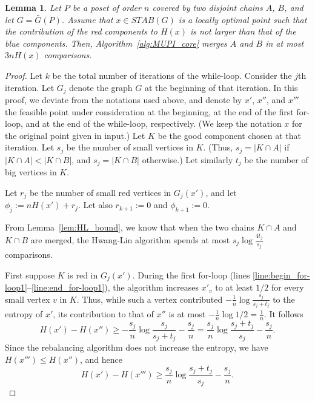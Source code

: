 \documentclass{article} \usepackage{fullpage}
\newtheorem{lemma}{Lemma}
\newcommand{\ent}{H}
\begin{document}
\begin{lemma}
\label{lem:MUPIqc}
Let $P$ be a poset of order $n$ covered by two disjoint chains $A$, $B$, and let $G = \bar{G}(P)$. Assume that $x \in STAB(G)$ is a locally optimal point such that the contribution of the red components to $\ent(x)$ is not larger than that of the blue components. Then, Algorithm~\ref{alg:MUPI_core} merges $A$ and $B$ in at most $3n\ent(x)$ comparisons.  
\end{lemma}
\begin{proof}
Let $k$ be the total number of iterations of the while-loop.
Consider the $j$th iteration. 
Let $G_{j}$ denote the graph $G$ at the beginning of that iteration.
In this proof, we deviate from the notations used above, and denote by $x'$, $x''$, and $x'''$ 
the feasible point under consideration at the beginning,
at the end of the first for-loop, and at the end of the while-loop, respectively. 
(We keep the notation $x$ for the original point given in input.)
Let $K$ be the good component chosen at that iteration.
Let $s_{j}$ be the number of small vertices in $K$. (Thus, $s_{j}= |K\cap A|$
if $|K\cap A| < |K\cap B|$, and $s_{j}= |K\cap B|$ otherwise.)
Let similarly $t_{j}$ be the number of big vertices in $K$.

Let $r_{j}$ be the number of small red vertices in $G_{j}(x')$,
and let $\phi_{j}:= n\ent(x') + r_{j}$. Let also $r_{k+1} := 0$ and $\phi_{k+1} := 0$.

From Lemma~\ref{lem:HL_bound}, we know that when the two chains $K\cap A$ and $K \cap B$ are merged,
the Hwang-Lin algorithm spends at most $s_{j} \log \frac{4t_{j}}{s_{j}}$ comparisons. 

First suppose $K$ is red in $G_{j}(x')$. During the first for-loop (lines \ref{line:begin_for-loop1}--\ref{line:end_for-loop1}), the algorithm increases $x'_{v}$ to at least $1/2$ for every small vertex $v$ in $K$. Thus, while such a vertex contributed $-\frac 1n \log \frac {s_{j}}{s_{j}+t_{j}}$ to the entropy of $x'$, its contribution to that of $x''$ is at most $- \frac 1n \log 1/2 = \frac 1n$. It follows 
$$
\ent(x') - \ent(x'') \geq 
-\frac {s_{j}}n \log \frac{s_{j}}{s_{j}+t_{j}} -  \frac{s_{j}}{n}
=  \frac {s_{j}}n \log \frac{s_{j}+t_{j}}{s_{j}} - \frac{s_{j}}{n}.
$$
Since the rebalancing algorithm does not increase the entropy, we have
$\ent(x''') \leq \ent(x'')$, and hence
\begin{equation}
\label{eq:delta_ent_red}
\ent(x') - \ent(x''') \geq 
\frac {s_{j}}n \log \frac{s_{j}+t_{j}}{s_{j}} - \frac{s_{j}}{n}.
\end{equation}



\end{proof}
\end{document}
